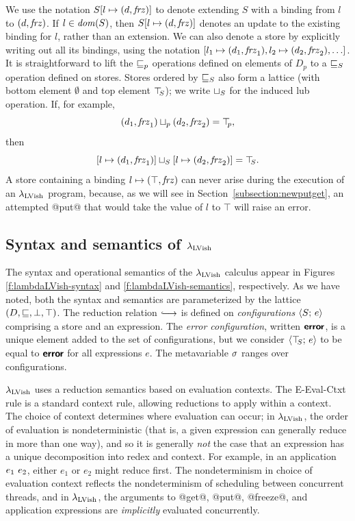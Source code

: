 \documentclass{article}
\begin{document}
We use the notation $S[l \mapsto (d, \mathit{frz})]$ to denote extending $S$
with a binding from $l$ to $(d, \mathit{frz})$.  If $l \in \mathit{dom}(S)$,
then $S[l \mapsto (d, \mathit{frz})]$ denotes an update to the existing
binding for $l$, rather than an extension.  We can also denote a store
by explicitly writing out all its bindings, using the notation
$\store{\storebinding{l_1}{d_1}{\status_1},
  \storebinding{l_2}{d_2}{\status_2}, \dots}$.  It is straightforward
to lift the $\sqsubseteq_p$ operations defined on elements of $D_p$ to a
$ \sqsubseteq_S $ operation defined on stores.  Stores ordered by
$ \sqsubseteq_S $ also form a lattice (with bottom element $\emptyset$
and top element $\top\hspace{-0.85mm}_{S}$); we write $ \sqcup_{S} $ for the induced lub
operation. If, for example,
\[ (d_1, \mathit{frz}_1) \sqcup_p (d_2, \mathit{frz}_2) = \top\hspace{-0.85mm}_{p}, \]
then
\[ \left[ l \mapsto (d_1, \mathit{frz}_1) \right] \sqcup_{S} \left[ l \mapsto (d_2, \mathit{frz}_2) \right] =
\top\hspace{-0.85mm}_{S}. \] A store containing a binding
$l \mapsto (\top, \mathit{frz})$ can never arise during the execution
of an $\lambda_{\textrm{LVish}}$ program, because, as we will see in
Section~\ref{subsection:newputget}, an attempted @put@ that would
take the value of $l$ to $\top$ will raise an error.

\subsection{Syntax and semantics of $\lambda_{\textrm{LVish}}$}

\FigLambdaLVishGrammar

\FigLambdaLVishSemantics

The syntax and operational semantics of the $\lambda_{\textrm{LVish}}$ calculus
appear in Figures \ref{f:lambdaLVish-syntax} and
\ref{f:lambdaLVish-semantics}, respectively.  As we have noted, both
the syntax and semantics are parameterized by the lattice $(D,
\sqsubseteq, \bot, \top)$.  The reduction relation $\parstepsto$ is
defined on \emph{configurations} $\langle S;\, e \rangle$ comprising a store
and an expression.  The \emph{error configuration}, written $\textbf{\textsf{error}}$,
is a unique element added to the set of configurations, but we
consider $\langle \top\hspace{-0.85mm}_{S};\, e \rangle$ to be equal to $\textbf{\textsf{error}}$ for all
expressions $e$.  The metavariable $\sigma$ ranges over configurations.

$\lambda_{\textrm{LVish}}$ uses a reduction semantics based on evaluation
contexts.  The {\sc E-Eval-Ctxt} rule is a standard context rule,
allowing reductions to apply within a context.  The choice of context
determines where evaluation can occur; in $\lambda_{\textrm{LVish}}$, the order of
evaluation is nondeterministic (that is, a given expression can
generally reduce in more than one way), and so it is generally
\emph{not} the case that an expression has a unique decomposition into
redex and context.  For example, in an application $e_1~e_2$,
either $e_1$ or $e_2$ might reduce first.  The nondeterminism in
choice of evaluation context reflects the nondeterminism of scheduling
between concurrent threads, and in $\lambda_{\textrm{LVish}}$, the arguments to
@get@, @put@, @freeze@, and application expressions are
\emph{implicitly} evaluated concurrently.
\end{document}
